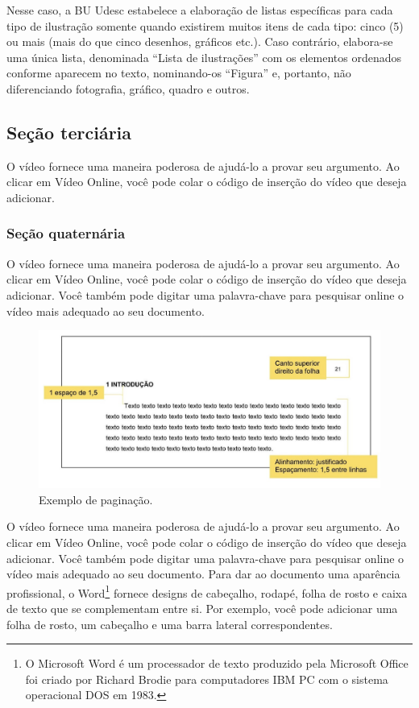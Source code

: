 Nesse caso, a BU Udesc estabelece a elaboração de listas específicas para cada tipo de ilustração somente quando existirem muitos itens de cada tipo: cinco (5) ou mais (mais do que cinco desenhos, gráficos etc.). Caso contrário, elabora-se uma única lista, denominada “Lista de ilustrações” com os elementos ordenados conforme aparecem no texto, nominando-os “Figura” e, portanto, não diferenciando fotografia, gráfico, quadro e outros.


\subsection{Seção terciária}

O vídeo fornece uma maneira poderosa de ajudá-lo a provar seu argumento. Ao clicar em Vídeo Online, você pode colar o código de inserção do vídeo que deseja adicionar.

\subsubsection{Seção quaternária}

O vídeo fornece uma maneira poderosa de ajudá-lo a provar seu argumento. Ao clicar em Vídeo Online, você pode colar o código de inserção do vídeo que deseja adicionar. Você também pode digitar uma palavra-chave para pesquisar online o vídeo mais adequado ao seu documento. 


\begin{figure}
	\centering
	\caption{Exemplo de paginação.}
	\includegraphics[scale=1]{Textuais/Picture1.png}
\end{figure}





O vídeo fornece uma maneira poderosa de ajudá-lo a provar seu argumento. Ao clicar em Vídeo Online, você pode colar o código de inserção do vídeo que deseja adicionar. Você também pode digitar uma palavra-chave para pesquisar online o vídeo mais adequado ao seu documento. Para dar ao documento uma aparência profissional, o Word\footnote{O Microsoft Word é um processador de texto produzido pela Microsoft Office foi criado por Richard Brodie para computadores IBM PC com o sistema operacional DOS em 1983.} fornece designs de cabeçalho, rodapé, folha de rosto e caixa de texto que se complementam entre si. Por exemplo, você pode adicionar uma folha de rosto, um cabeçalho e uma barra lateral correspondentes.

